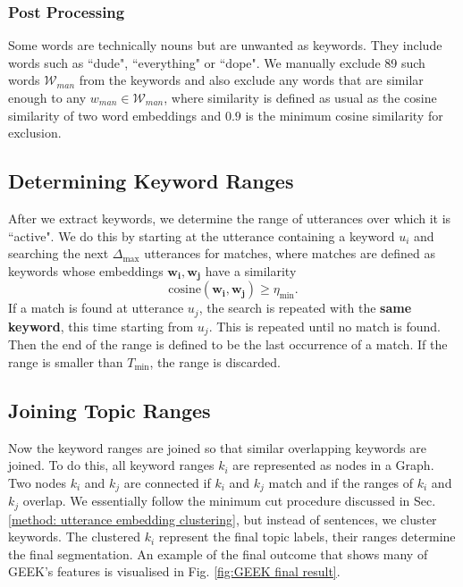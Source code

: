        \subsubsection{Post Processing}
            Some words are technically nouns but are unwanted as keywords. They include words such as ``dude", ``everything" or ``dope". We manually exclude 89 such words $\mathcal{W}_{man}$ from the keywords and also exclude any words that are similar enough to any $w_{man} \in \mathcal{W}_{man}$, where similarity is defined as usual as the cosine similarity of two word embeddings and $0.9$ is the minimum cosine similarity for exclusion.
        
    \subsection{Determining Keyword Ranges}
        After we extract keywords, we determine the range of utterances over which it is ``active". We do this by starting at the utterance containing a keyword $u_i$ and searching the next $\Delta_{\text{max}}$ utterances for matches, where matches are defined as keywords whose embeddings $\mathbf{w_i}, \mathbf{w_j}$ have a similarity
        \begin{equation}
            \text{cosine}(\mathbf{w_i}, \mathbf{w_j}) \geq \eta_{\text{min}}.
        \end{equation}
        If a match is found at utterance $u_j$, the search is repeated with the \textbf{same keyword}, this time starting from $u_j$. This is repeated until no match is found. Then the end of the range is defined to be the last occurrence of a match. If the range is smaller than $T_{\text{min}}$, the range is discarded. 
        
    \subsection{Joining Topic Ranges}
        Now the keyword ranges are joined so that similar overlapping keywords are joined. To do this, all keyword ranges $k_i$ are represented as nodes in a Graph. Two nodes $k_i$ and $k_j$ are connected if $k_i$ and $k_j$ match and if the ranges of $k_i$ and $k_j$ overlap. We essentially follow the minimum cut procedure discussed in Sec. \ref{method: utterance embedding clustering}, but instead of sentences, we cluster keywords. The clustered $k_i$ represent the final topic labels, their ranges determine the final segmentation. An example of the final outcome that shows many of GEEK's features is visualised in Fig. \ref{fig:GEEK final result}.
        

